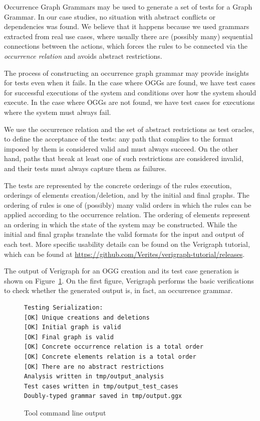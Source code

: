
Occurrence Graph Grammars may be used to generate a set of tests for a Graph Grammar. In our case studies, no situation with abstract conflicts or dependencies was found. We believe that it happens because we used grammars extracted from real use cases, where usually there are (possibly many) sequential connections between the actions, which forces the rules to be connected via the \emph{occurrence relation} and avoids abstract restrictions. 

The process of constructing an occurrence graph grammar may provide insights for tests even when it fails. In the case where OGGs are found, we have test cases for successful executions of the system and conditions over how the system should execute. In the case where OGGs are not found, we have test cases for executions where the system must always fail.

We use the occurrence relation and the set of abstract restrictions as test oracles, to define the acceptance of the tests: any path that complies to the format imposed by them is considered valid and must always succeed. On the other hand, paths that break at least one of such restrictions are considered invalid, and their tests must always capture them as failures.

The tests are represented by the concrete orderings of the rules execution, orderings of elements creation/deletion, and by the initial and final graphs. The ordering of rules is one of (possibly) many valid orders in which the rules can be applied according to the occurrence relation. The ordering of elements represent an ordering in which the state of the system may be constructed. While the initial and final graphs translate the valid formats for the input and output of each test. More specific usability details can be found on the Verigraph tutorial, which can be found at \url{https://github.com/Verites/verigraph-tutorial/releases}.


The output of Verigraph for an OGG creation and its test case generation is shown on Figure~\ref{fig:tests:checklist}. On the first figure, Verigraph performs the basic verifications to check whether the generated output is, in fact, an occurrence grammar.

\begin{figure}[!ht]
\caption{Tool command line output}
\begin{verbatim}
Testing Serialization:
[OK] Unique creations and deletions
[OK] Initial graph is valid
[OK] Final graph is valid
[OK] Concrete occurrence relation is a total order
[OK] Concrete elements relation is a total order
[OK] There are no abstract restrictions
Analysis written in tmp/output_analysis
Test cases written in tmp/output_test_cases
Doubly-typed grammar saved in tmp/output.ggx
\end{verbatim}
  \label{fig:tests:checklist}
\end{figure}

